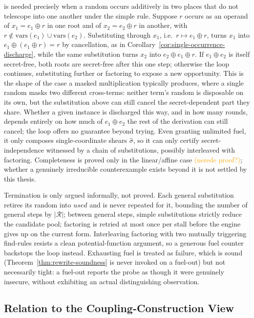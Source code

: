    is needed precisely when a random occurs additively in two
  places that do not telescope into one another under the simple rule. Suppose $r$
  occurs as an operand of $x_1 = e_1 \oplus r$ in one root and of $x_2 = e_2 \oplus r$
  in another, with $r \notin \mathrm{vars}(e_1) \cup \mathrm{vars}(e_2)$.
  Substituting through $x_1$, i.e.\ $r \mapsto e_1 \oplus r$, turns $x_1$ into
  $e_1 \oplus (e_1 \oplus r) = r$ by cancellation, as in
  Corollary~\ref{cor:single-occurrence-discharge}, while the same substitution turns
  $x_2$ into $e_2 \oplus e_1 \oplus r$. If $e_1 \oplus e_2$ is itself secret-free,
  both roots are secret-free after this one step; otherwise the loop continues,
  substituting further or factoring to expose a new opportunity. This is the shape of
  the case a masked multiplication typically produces, where a single random masks
  two different cross-terms: neither term's random is disposable on its own, but the
  substitution above can still cancel the secret-dependent part they share. Whether a
  given instance is discharged this way, and in how many rounds, depends entirely on
  how much of $e_1 \oplus e_2$ the rest of the derivation can still cancel; the loop
  offers no guarantee beyond trying. Even granting unlimited fuel, it only composes
  single-coordinate shears $\widehat{\sigma}$, so it can only certify
  secret-independence witnessed by a chain of substitutions, possibly interleaved
  with factoring. Completeness is proved only in the linear/affine case
  \textcolor{orange}{(nerede proof?)}; whether a genuinely irreducible counterexample
  exists beyond it is not settled by this thesis.

  Termination is only argued informally, not proved. Each general substitution
  retires its random into $\mathit{used}$ and is never repeated for it, bounding the
  number of general steps by $|\mathcal{R}|$; between general steps, simple
  substitutions strictly reduce the candidate pool; factoring is retried at most once
  per stall before the engine gives up on the current form. Interleaving factoring
  with two mutually triggering find-rules resists a clean potential-function
  argument, so a generous fuel counter backstops the loop instead. Exhausting fuel is
  treated as failure, which is sound (Theorem~\ref{thm:rewrite-soundness} is never
  invoked on a fuel-out) but not necessarily tight: a fuel-out reports the probe as
  though it were genuinely insecure, without exhibiting an actual distinguishing
  observation.

  \subsection{Relation to the Coupling-Construction View}
  \label{sec:coupling-view}

